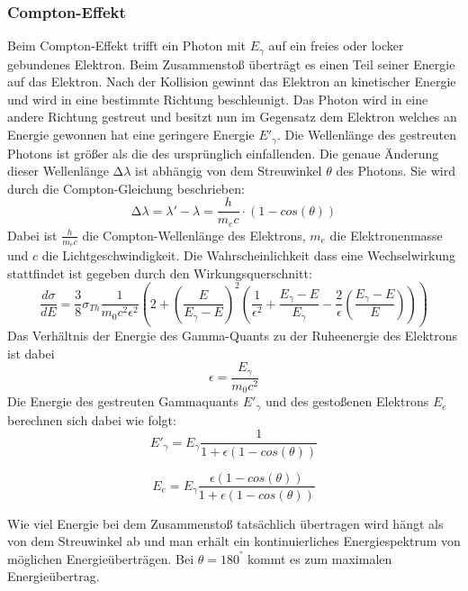 \subsubsection{Compton-Effekt}
Beim Compton-Effekt trifft ein Photon mit $E_{\gamma}$ auf ein freies oder locker gebundenes Elektron. Beim Zusammenstoß überträgt es einen Teil seiner Energie auf das 
Elektron. Nach der Kollision gewinnt das Elektron an kinetischer Energie und wird in eine bestimmte Richtung beschleunigt. Das Photon wird in eine andere Richtung gestreut 
und besitzt nun im Gegensatz dem Elektron welches an Energie gewonnen hat eine geringere Energie $E'_{\gamma}$. Die Wellenlänge des 
gestreuten Photons ist größer als die des ursprünglich einfallenden. Die genaue Änderung dieser Wellenlänge $\increment\lambda$ ist abhängig von dem Streuwinkel $\theta$ des
Photons. Sie wird durch die Compton-Gleichung beschrieben:
\begin{equation}
    \increment\lambda= \lambda'-\lambda=\frac{h}{m_ec}\cdot(1-cos(\theta)) 
\end{equation}
Dabei ist $\frac{h}{m_ec}$ die Compton-Wellenlänge des Elektrons, \(m_e\) die Elektronenmasse und \(c\) die Lichtgeschwindigkeit.
Die Wahrscheinlichkeit dass eine Wechselwirkung stattfindet ist gegeben durch den Wirkungsquerschnitt:
\begin{equation}
    \frac{d\sigma}{dE} = \frac{3}{8}\sigma_{Th}\frac{1}{m_0c^2\epsilon^2}\left(2 + \left(\frac{E}{E_{\gamma}-E}\right)^2 \left(\frac{1}{\epsilon^2} + \frac{E_{\gamma}-E}{E_{\gamma}} - \frac{2}{\epsilon}\left(\frac{E_{\gamma}-E}{E}\right)\right)\right)
    \label{eq:querschnitt}
\end{equation}
Das Verhältnis der Energie des Gamma-Quants zu der Ruheenergie des Elektrons ist dabei
\begin{equation}
    \epsilon=\frac{E_{\gamma}}{m_0c^2}
\end{equation}    
Die Energie des gestreuten Gammaquants $E'_{\gamma}$ und des gestoßenen Elektrons $E_e$ berechnen sich dabei wie folgt:
\begin{equation}
    E'_{\gamma}=E_{\gamma}\frac{1}{1+\epsilon(1-cos(\theta))}
    \label{eq:estrich}
\end{equation}

\begin{equation}
    E_e=E_{\gamma}\frac{\epsilon(1-cos(\theta))}{1+\epsilon(1-cos(\theta))}
    \label{eq:energie_e}
\end{equation}

Wie viel Energie bei dem Zusammenstoß tatsächlich übertragen wird hängt als von dem Streuwinkel ab und man erhält ein kontinuierliches 
Energiespektrum von möglichen Energieüberträgen. Bei $\theta= 180^°$ kommt es zum maximalen Energieübertrag.
\cite{Compton}


